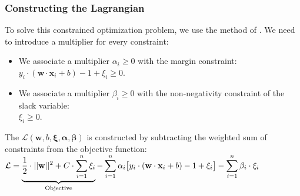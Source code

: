 \subsubsection{Constructing the Lagrangian}
To solve this constrained optimization problem, we use the method of . We need to introduce a multiplier for every constraint:
\begin{itemize}
    \item We associate a multiplier $\alpha_i \geq 0$ with the margin constraint:
    \\[0.2cm]
    \hspace*{1.3cm}
    $y_i \cdot(\mathbf{w} \cdot \mathbf{x}_i + b) - 1 + \xi_i \geq 0$.
    \item We associate a multiplier $\beta_i \geq 0$ with the non-negativity constraint of the slack variable:
    \\[0.2cm]
    \hspace*{1.3cm}
    $\xi_i \geq 0$.
\end{itemize}
The  $\mathcal{L}(\mathbf{w}, b, \boldsymbol{\xi}, \boldsymbol{\alpha}, \boldsymbol{\beta})$ is constructed by subtracting the weighted sum of constraints from the objective function:
\\[0.2cm]
\hspace*{1.3cm}
$\displaystyle \mathcal{L} = \underbrace{\frac{1}{2} \cdot||\mathbf{w}||^2 + C \cdot\sum_{i=1}^n \xi_i}_{\text{Objective}} - \sum_{i=1}^n \alpha_i \bigl[ y_i \cdot(\mathbf{w} \cdot \mathbf{x}_i + b) - 1 + \xi_i \bigr] - \sum_{i=1}^n \beta_i \cdot\xi_i$

